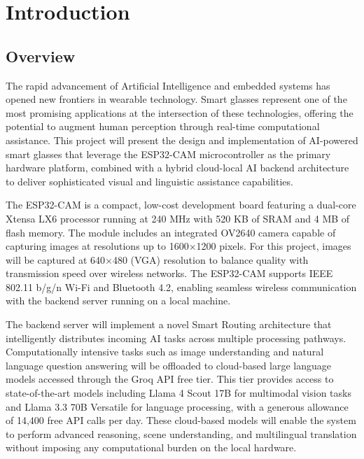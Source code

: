 \chapter{Introduction}

\section{Overview}
The rapid advancement of Artificial Intelligence and embedded systems has opened new frontiers in wearable technology. Smart glasses represent one of the most promising applications at the intersection of these technologies, offering the potential to augment human perception through real-time computational assistance. This project will present the design and implementation of AI-powered smart glasses that leverage the ESP32-CAM microcontroller as the primary hardware platform, combined with a hybrid cloud-local AI backend architecture to deliver sophisticated visual and linguistic assistance capabilities.

The ESP32-CAM is a compact, low-cost development board featuring a dual-core Xtensa LX6 processor running at 240 MHz with 520 KB of SRAM and 4 MB of flash memory. The module includes an integrated OV2640 camera capable of capturing images at resolutions up to 1600$\times$1200 pixels. For this project, images will be captured at 640$\times$480 (VGA) resolution to balance quality with transmission speed over wireless networks. The ESP32-CAM supports IEEE 802.11 b/g/n Wi-Fi and Bluetooth 4.2, enabling seamless wireless communication with the backend server running on a local machine.

The backend server will implement a novel Smart Routing architecture that intelligently distributes incoming AI tasks across multiple processing pathways. Computationally intensive tasks such as image understanding and natural language question answering will be offloaded to cloud-based large language models accessed through the Groq API free tier. This tier provides access to state-of-the-art models including Llama 4 Scout 17B for multimodal vision tasks and Llama 3.3 70B Versatile for language processing, with a generous allowance of 14,400 free API calls per day. These cloud-based models will enable the system to perform advanced reasoning, scene understanding, and multilingual translation without imposing any computational burden on the local hardware.

